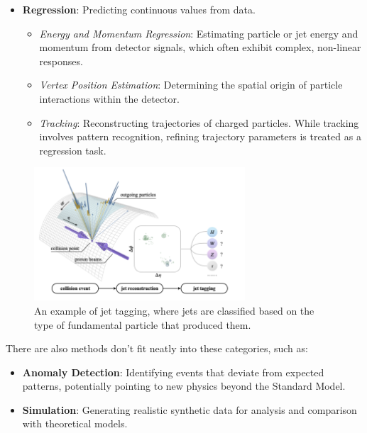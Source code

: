 \documentclass[letterpaper,12pt]{article}
\begin{document}
\begin{spacing}{1.125}
\begin{itemize}
  \item \textbf{Regression}: Predicting continuous values from data.
  \begin{itemize}
      \item \textit{Energy and Momentum Regression}: Estimating particle or jet energy and momentum from detector signals, which often exhibit complex, non-linear responses.
      \item \textit{Vertex Position Estimation}: Determining the spatial origin of particle interactions within the detector.
      \item \textit{Tracking}: Reconstructing trajectories of charged particles. While tracking involves pattern recognition, refining trajectory parameters is treated as a regression task.
  \end{itemize}
\end{itemize}

\begin{figure}[H]
\centering
\includegraphics[width=0.7\textwidth]{jet-tagging.png}
\caption{ An example of jet tagging, where jets are classified based on the type of fundamental particle that produced them.}
\end{figure}

There are also methods don't fit neatly into these categories, such as:
\begin{itemize}
\item \textbf{Anomaly Detection}: Identifying events that deviate from expected patterns, potentially pointing to new physics beyond the Standard Model.

\item \textbf{Simulation}: Generating realistic synthetic data for analysis and comparison with theoretical models.


\end{itemize}
\end{spacing}
\end{document}
